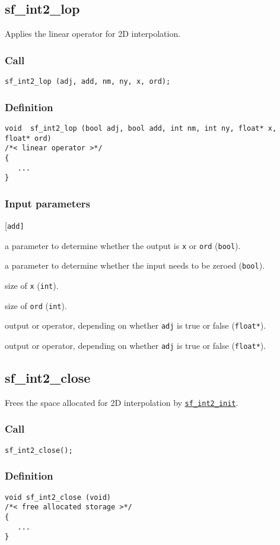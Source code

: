 \subsection{{sf\_int2\_lop}}
Applies the linear operator for 2D interpolation.

\subsubsection*{Call}
\begin{verbatim}sf_int2_lop (adj, add, nm, ny, x, ord);\end{verbatim}

\subsubsection*{Definition}
\begin{verbatim}
void  sf_int2_lop (bool adj, bool add, int nm, int ny, float* x, float* ord)
/*< linear operator >*/
{ 
   ...
}
\end{verbatim}

\subsubsection*{Input parameters}
\begin{desclist}{\tt }{\quad}[\tt add]
   \setlength\itemsep{0pt}
   \item[adj] a parameter to determine whether the output is \texttt{x} or \texttt{ord} (\texttt{bool}).
   \item[add] a parameter to determine whether the input needs to be zeroed (\texttt{bool}).
   \item[nm]  size of \texttt{x} (\texttt{int}).
   \item[ny]  size of \texttt{ord} (\texttt{int}).
   \item[x]   output or operator, depending on whether \texttt{adj} is true or false (\texttt{float*}).
   \item[ord] output or operator, depending on whether \texttt{adj} is true or false (\texttt{float*}).
\end{desclist}




\subsection{{sf\_int2\_close}}
Frees the space allocated for 2D interpolation by \hyperref[sec:sf_int2_init]{\texttt{sf\_int2\_init}}.

\subsubsection*{Call}
\begin{verbatim}sf_int2_close();\end{verbatim}

\subsubsection*{Definition}
\begin{verbatim}
void sf_int2_close (void)
/*< free allocated storage >*/
{
   ...
}
\end{verbatim}

